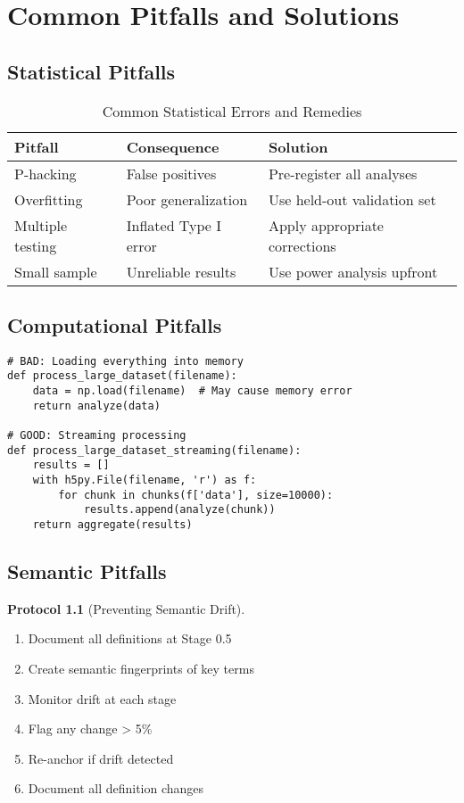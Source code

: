 \documentclass[12pt,oneside]{memoir}
\theoremstyle{plain}
\theoremstyle{definition}
\newtheorem{protocol}[theorem]{Protocol}
\theoremstyle{remark}
\begin{document}
\chapter{Common Pitfalls and Solutions}

\section{Statistical Pitfalls}

\begin{table}[h]
\centering
\caption{Common Statistical Errors and Remedies}
\begin{tabular}{L{3cm}L{4cm}L{4cm}}
\toprule
\textbf{Pitfall} & \textbf{Consequence} & \textbf{Solution} \\
\midrule
P-hacking & False positives & Pre-register all analyses \\
Overfitting & Poor generalization & Use held-out validation set \\
Multiple testing & Inflated Type I error & Apply appropriate corrections \\
Small sample & Unreliable results & Use power analysis upfront \\
\bottomrule
\end{tabular}
\end{table}

\section{Computational Pitfalls}

\begin{lstlisting}[caption={Memory Management Example}]
# BAD: Loading everything into memory
def process_large_dataset(filename):
    data = np.load(filename)  # May cause memory error
    return analyze(data)

# GOOD: Streaming processing
def process_large_dataset_streaming(filename):
    results = []
    with h5py.File(filename, 'r') as f:
        for chunk in chunks(f['data'], size=10000):
            results.append(analyze(chunk))
    return aggregate(results)
\end{lstlisting}

\section{Semantic Pitfalls}

\begin{protocol}[Preventing Semantic Drift]
\begin{enumerate}
\item Document all definitions at Stage 0.5
\item Create semantic fingerprints of key terms
\item Monitor drift at each stage
\item Flag any change > 5\%
\item Re-anchor if drift detected
\item Document all definition changes
\end{enumerate}
\end{protocol}
\end{document}
